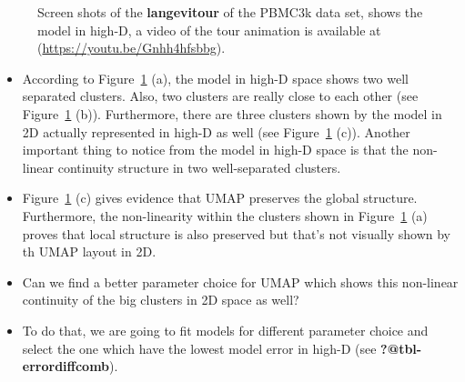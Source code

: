 \documentclass[
  12pt]{article}
\begin{document}
\begin{figure}[H]
\begin{minipage}[t]{0.33\linewidth}
{{}

}

\subcaption{\label{fig-pbmc1_sc3}}
\end{minipage}%

\caption{\label{fig-pbmc1_sc}Screen shots of the \textbf{langevitour} of
the PBMC3k data set, shows the model in high-D, a video of the tour
animation is available at (\url{https://youtu.be/Gnhh4hfsbbg}).}

\end{figure}

\begin{itemize}
\item
  According to Figure~\ref{fig-pbmc1_sc} (a), the model in high-D space
  shows two well separated clusters. Also, two clusters are really close
  to each other (see Figure~\ref{fig-pbmc1_sc} (b)). Furthermore, there
  are three clusters shown by the model in 2D actually represented in
  high-D as well (see Figure~\ref{fig-pbmc1_sc} (c)). Another important
  thing to notice from the model in high-D space is that the non-linear
  continuity structure in two well-separated clusters.
\item
  Figure~\ref{fig-pbmc1_sc} (c) gives evidence that UMAP preserves the
  global structure. Furthermore, the non-linearity within the clusters
  shown in Figure~\ref{fig-pbmc1_sc} (a) proves that local structure is
  also preserved but that's not visually shown by th UMAP layout in 2D.
\item
  Can we find a better parameter choice for UMAP which shows this
  non-linear continuity of the big clusters in 2D space as well?
\item
  To do that, we are going to fit models for different parameter choice
  and select the one which have the lowest model error in high-D (see
  \textbf{?@tbl-errordiffcomb}).
\end{itemize}
\end{document}
